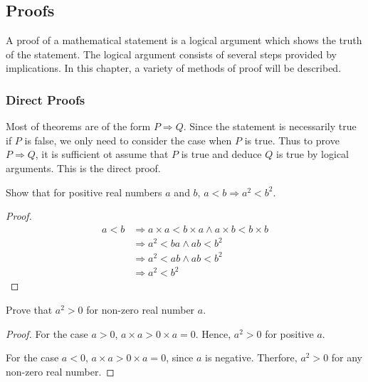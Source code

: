 \documentclass[../main.tex]{subfiles}
\begin{document}
\subsection{Proofs}
A proof of a mathematical statement is a logical argument which shows the truth of the statement.
The logical argument consists of several steps provided by implications.
In this chapter, a variety of methods of proof will be described.

\subsubsection{Direct Proofs}
Most of theorems are of the form $P \Rightarrow Q$.
Since the statement is necessarily true if $P$ is false, we only need to consider the case when $P$ is true.
Thus to prove $P \Rightarrow Q$, it is sufficient ot assume that $P$ is true and deduce $Q$ is true by logical arguments. This is the \textsf{direct proof}.

\begin{ex}
    Show that for positive real numbers $a$ and $b$, $a < b \Rightarrow a^2 < b^2$.
\end{ex}
\begin{proof}
    \begin{align*}
        a < b &\Rightarrow a \times a < b \times a \wedge a \times b < b \times b\\
              &\Rightarrow a^2 < ba \wedge ab < b^2\\
              &\Rightarrow a^2 < ab \wedge ab < b^2\\
              &\Rightarrow a^2 < b^2
    \end{align*}
\end{proof}

\begin{ex}
    Prove that $a^2 > 0$ for non-zero real number $a$.
\end{ex}
\begin{proof}
    For the case $a > 0$, $a \times a > 0 \times a = 0$.
    Hence, $a^2 > 0$ for positive $a$.

    For the case $a <0$, $a \times a > 0\times a = 0$, since $a$ is negative.
    Therfore, $a^2 > 0$ for any non-zero real number.
\end{proof}
\end{document}
